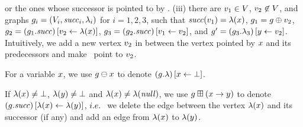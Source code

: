\begin{graphop}[$\graph\addVarAsPredOf{\xvar}{\yvar}$]
    or the ones whose successor is pointed to by \xvar.
(iii) \label{addVarAsPred3}%
    there are $v_1\in V$, $v_2\not\in V$,
    and graphs $g_i=\left(V_i,{\it succ}_i,\lambda_i\right)$
    for $i=1,2,3$, %
    such that ${\it succ}(v_1)=\lambda(x)$,
    $g_1=g\oplus{\ensuremath{v}}_2$,
    $g_2=\left(g_1.{\it succ}\right)\left[v_2\leftarrow\lambda(x)\right]$,
    $g_3=\left(g_2.{\it succ}\right)\left[v_1\leftarrow v_2\right]$,
    and
    $g'=\left(g_3.\lambda_3\right)\left[y\leftarrow v_2\right]$.
    Intuitively, we add a new vertex %
    $v_2$ in between the vertex %
    pointed by $x$ and its predecessors and make \yvar\ point to
    $v_2$.
\end{graphop}
%

%
\begin{graphop}[$\graph\delVar{\xvar}$]
  For a variable $x$, we use $\graph\delVar{\xvar}$ to denote
  $\left(g.\lambda\right)\left[x\leftarrow\bot\right]$.
\end{graphop}
%

\begin{graphop}[$\graph\addEdgeBetween{\xvar}{\yvar}$]
  If $\lambda(x)\neq\bot$, $\lambda(y)\neq\bot$ and
  $\lambda(x)\neq\lambda({\it null})$, we use
  $\graph\addEdgeBetween{\xvar}{\yvar}$ to denote
  $\left(g.{\it succ}\right)\left[\lambda(x)\leftarrow\lambda(y)\right]$,
  $i.e.\ $ we delete the edge between the vertex
  $\lambda(x)$ and its successor (if any) and add %
  an edge
  from $\lambda(x)$ to $\lambda(y)$.
\end{graphop}
%

